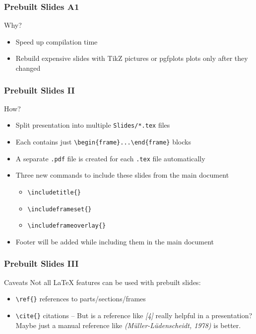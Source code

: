 \begin{frame}
\frametitle{Prebuilt Slides A1}
\begin{block}{Why?}
  \begin{itemize}
    \item Speed up compilation time
    \item Rebuild expensive slides with TikZ pictures or pgfplots plots only after they changed
  \end{itemize}
\end{block}
\end{frame}

\begin{frame}
\frametitle{Prebuilt Slides II}
\begin{block}{How?}
  \begin{itemize}
    \item Split presentation into multiple \texttt{Slides/*.tex} files
    \item Each contains just \texttt{\textbackslash begin\{frame\}...\textbackslash end\{frame\}} blocks
    \item A separate \texttt{.pdf} file is created for each \texttt{.tex} file automatically
    \item Three new commands to include these slides from the main document
      \begin{itemize}
        \item \texttt{\textbackslash includetitle\{\}}
	\item \texttt{\textbackslash includeframeset\{\}}
	\item \texttt{\textbackslash includeframeoverlay\{\}}
      \end{itemize}
    \item Footer will be added while including them in the main document
  \end{itemize}
\end{block}
\end{frame}

\begin{frame}
\frametitle{Prebuilt Slides III}
\begin{block}{Caveats}
  Not all \LaTeX{} features can be used with prebuilt slides:
  \begin{itemize}
    \item \texttt{\textbackslash ref\{\}} references to parts/sections/frames
    \item \texttt{\textbackslash cite\{\}} citations --
      But is a reference like \emph{[4]} really helpful in a presentation?\\
      Maybe just a manual reference like \emph{(Müller-Lüdenscheidt, 1978)} is better.
  \end{itemize}
\end{block}
\end{frame}

